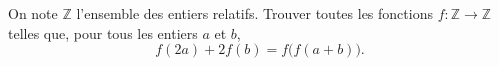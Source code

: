 On note $\mathbb{Z}$ l'ensemble des entiers relatifs. Trouver toutes les fonctions
$f : \mathbb{Z} \to \mathbb{Z}$ telles que, pour tous les entiers $a$ et $b$,
\[
f(2a) + 2f(b) = f\bigl(f(a+b)\bigr).
\]
